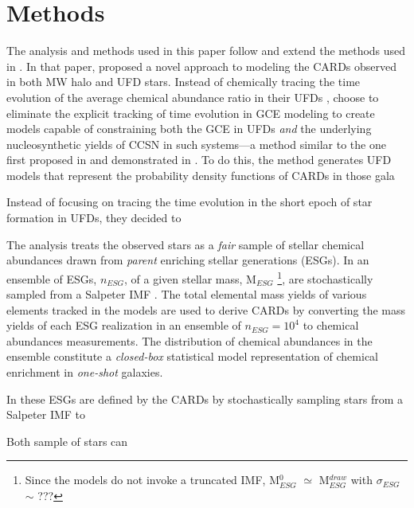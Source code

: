 \section{Methods}
\label{methods}

The analysis and methods used in this paper follow and extend the methods used in \citet{Lee_2013}. In that paper, \citet{Lee_2013} proposed a novel approach to modeling the CARDs observed in both MW halo and UFD stars. Instead of chemically tracing the time evolution of the average chemical abundance ratio in their UFDs \citep[see, e.g.,][i.e., a standard GCE modeling method]{Cohen_2010,???,???reviews}, \citet{Lee_2013} choose to eliminate the explicit tracking of time evolution in GCE modeling to create models capable of constraining both the GCE in UFDs {\it and} the underlying nucleosynthetic yields of CCSN in such systems---a method similar to the one first proposed in \citet{Karlsson2005a} and demonstrated in \citet{Karlsson_2005b}. To do this, the method generates UFD models that represent the probability density functions of CARDs in those gala


Instead of focusing on tracing the time evolution in the short epoch of star formation in UFDs, they decided to 



The analysis treats the observed stars as a {\it fair} sample of stellar chemical abundances drawn from {\it parent} enriching stellar generations (ESGs). In \citet{Lee_2013} an ensemble of ESGs, $n_{ESG}$, of a given stellar mass, M$_{ESG}$
\footnote{Since the models do not invoke a truncated IMF, M$_{ESG}^0$ $\simeq$ M$_{ESG}^{draw}$ with $\sigma_{ESG}$ $\sim$ ???}, 
are stochastically sampled from a Salpeter IMF \citep{Salpeter_1955}. The total elemental mass yields of various elements tracked in the models are used to derive CARDs by converting the mass yields of each ESG realization in an ensemble of $n_{ESG} = 10^4$ to chemical abundances measurements. The distribution of chemical abundances in the ensemble constitute a {\it closed-box} statistical model representation of chemical enrichment in {\it one-shot} galaxies. 


In \citet{Lee_2013} these ESGs are defined by the CARDs by stochastically sampling stars from a Salpeter IMF \citep{Salpeter_1955} to    

Both sample of stars can 